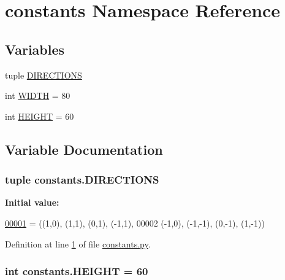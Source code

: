 \hypertarget{namespaceconstants}{\section{constants Namespace Reference}
\label{namespaceconstants}
}
\subsection*{Variables}
\begin{DoxyCompactItemize}
\item 
tuple \hyperlink{namespaceconstants_ac910045b50610ec197515a3635d8d037}{D\+I\+R\+E\+C\+T\+I\+O\+N\+S}
\item 
int \hyperlink{namespaceconstants_aa1f49ae50d4547cd3b9f4801d04f5830}{W\+I\+D\+T\+H} = 80
\item 
int \hyperlink{namespaceconstants_a581305cb095bf2d8826a12abef66a15e}{H\+E\+I\+G\+H\+T} = 60
\end{DoxyCompactItemize}


\subsection{Variable Documentation}
\hypertarget{namespaceconstants_ac910045b50610ec197515a3635d8d037}{
\subsubsection[{D\+I\+R\+E\+C\+T\+I\+O\+N\+S}]{\setlength{\rightskip}{0pt plus 5cm}tuple constants.\+D\+I\+R\+E\+C\+T\+I\+O\+N\+S}}\label{namespaceconstants_ac910045b50610ec197515a3635d8d037}
{\bfseries Initial value\+:}
\begin{DoxyCode}
\hypertarget{namespaceconstants_l00001}{}\hyperlink{namespaceconstants_ac910045b50610ec197515a3635d8d037}{00001} = ((1,0), (1,1), (0,1), (-1,1),
00002     (-1,0), (-1,-1), (0,-1), (1,-1))
\end{DoxyCode}


Definition at line \hyperlink{constants_8py_source_l00001}{1} of file \hyperlink{constants_8py_source}{constants.\+py}.

\hypertarget{namespaceconstants_a581305cb095bf2d8826a12abef66a15e}{
\subsubsection[{H\+E\+I\+G\+H\+T}]{\setlength{\rightskip}{0pt plus 5cm}int constants.\+H\+E\+I\+G\+H\+T = 60}}\label{namespaceconstants_a581305cb095bf2d8826a12abef66a15e}



